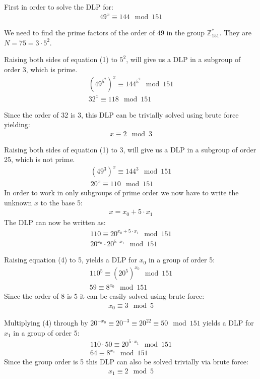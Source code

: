 First in order to solve the DLP for:
\begin{eqnarray}
    49^{x} \equiv 144 \mod 151
\end{eqnarray}

We need to find the prime factors of the order of $49$ in the group 
$\mathbb{Z}^{*}_{151}$. They are $N = 75 = 3 \cdot 5^{2}$.

Raising both sides of equation (1) to $5^{2}$, will give us a DLP in a subgroup of order 3, which is prime.
\begin{eqnarray*}
    (49^{5^{2}})^{x} \equiv 144^{5^{2}} \mod 151 \\
    32^{x} \equiv 118 \mod 151
\end{eqnarray*}

Since the order of 32 is 3, this DLP can be trivially solved using brute force yielding:
\begin{eqnarray}
    x \equiv 2 \mod 3
\end{eqnarray}


Raising both sides of equation (1) to $3$, will give us a DLP in a subgroup of order 25, which is not prime.
\begin{eqnarray*}
    (49^{3})^{x} \equiv 144^{3} \mod 151 \\
    20^{x} \equiv 110 \mod 151
\end{eqnarray*}
In order to work in only subgroups of prime order we now have to write the unknown $x$ to the base 5:
\begin{eqnarray*}
    x = x_{0} + 5 \cdot x_{1}
\end{eqnarray*}
The DLP can now be written as:
\begin{eqnarray}
    110 \equiv 20^{x_0 + 5 \cdot x_{1}} \mod 151 \\
    20^{x_0} \cdot 20^{5 \cdot x_{1}} \mod 151
\end{eqnarray}

Raising equation (4) to 5, yields a DLP for $x_{0}$ in a group of order 5:
\begin{eqnarray*}
    110^{5} \equiv (20^{5})^{x_0} \mod 151 \\ 
    59 \equiv 8^{x_{0}} \mod 151
\end{eqnarray*}
Since the order of 8 is 5 it can be easily solved using brute force:
\begin{eqnarray}
    x_{0} \equiv 3 \mod 5
\end{eqnarray}

Multiplying (4) through by $20^{-x_{0}} \equiv 20^{-3} \equiv 20^{22} \equiv 50 \mod 151$ yields a DLP for $x_{1}$ in a group of order 5:
\begin{eqnarray*}
    110 \cdot 50 \equiv 20^{5 \cdot x_{1}} \mod 151 \\
    64 \equiv 8^{x_{1}} \mod 151
\end{eqnarray*}
Since the group order is 5 this DLP can also be solved trivially via brute force:
\begin{eqnarray}
    x_{1} \equiv 2 \mod 5
\end{eqnarray}

